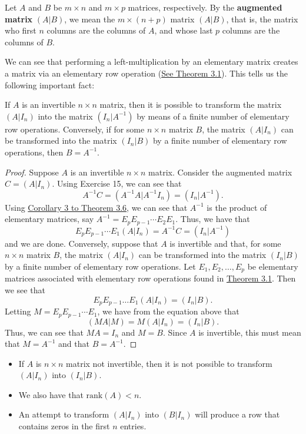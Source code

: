 \begin{definition}
   Let \( A  \) and \( B  \) be \( m \times n  \) and \( m \times p  \) matrices, respectively. By the \textbf{augmented matrix} \( (A|B)  \), we mean the \( m \times (n + p)  \) matrix \( (A|B)  \), that is, the matrix who first \( n  \) columns are the columns of \( A  \), and whose last \( p  \) columns are the columns of \( B  \).
\end{definition}
We can see that performing a left-multiplication by an elementary matrix creates a matrix via an elementary row operation ({\hyperref[Theorem 3.1]{See Theorem 3.1}}). This tells us the following important fact:
\begin{prop}
    If \( A  \) is an invertible \( n \times n  \) matrix, then it is possible to transform the matrix \( (A| {I}_{n})  \) into the matrix \( ({I}_{n} | A^{-1}) \) by means of a finite number of elementary row operations. Conversely, if for some \( n \times n  \) matrix \( B  \), the matrix \( (A | {I}_{n}) \) can be transformed into the matrix \( ({I}_{n} | B ) \) by a finite number of elementary row operations, then \( B = A^{-1} \).
\end{prop}
\begin{proof}
Suppose \( A  \) is an invertible \( n \times n  \) matrix. Consider the augmented matrix \( C = (A | {I}_{n}) \). Using Exercise 15, we can see that
\[  A^{-1} C = (A^{-1} A | A^{-1} {I}_{n}) = ({I}_{n} | A^{-1}). \]
Using {\hyperref[Corollary 3 to Theorem 3.6]{Corollary 3 to Theorem 3.6}}, we can see that \( A^{-1} \) is the product of elementary matrices, say \( A^{-1} = {E}_{p} {E}_{p-1} \cdots {E}_{2} {E}_{1}  \). Thus, we have that
\[  {E}_{p} {E}_{p-1} \cdots {E}_{1} (A| {I}_{n}) = A^{-1} C = ({I}_{n} | A^{-1}) \]
and we are done.
Conversely, suppose that \( A  \) is invertible and that, for some \(  n \times n  \) matrix \( B  \), the matrix \( (A | {I}_{n}) \) can be transformed into the matrix \( ({I}_{n} | B ) \) by a finite number of elementary row operations. Let \( {E}_{1}, {E}_{2}, \dots, {E}_{p} \) be elementary matrices associated with elementary row operations found in {\hyperref[Theorem 3.1]{Theorem 3.1}}. Then we see that
\[ {E}_{p } {E}_{p-1} \dots {E}_{1} (A | {I}_{n}) = ({I}_{n} | B).  \]
Letting \( M = {E}_{p} {E}_{p-1} \cdots {E}_{1} \), we have from the equation above that
\[  (MA | M) = M(A | {I}_{n}) = ({I}_{n} | B). \]
Thus, we can see that \( MA = {I}_{n} \) and \( M = B  \). Since \( A  \) is invertible, this must mean that \( M = A^{-1} \) and that \( B = A^{-1} \). 
\end{proof}

\begin{itemize}
    \item If \( A  \) is \( n \times n \) matrix not invertible, then it is not possible to transform \( (A|{I}_{n}) \) into \( ({I}_{n} | B ) \). 
    \item We also have that \( \text{rank}(A) < n \).
    \item An attempt to transform \( (A | {I}_{n})  \) into \( (B | {I}_{n}) \) will produce a row that contains zeros in the first \( n  \) entries.
\end{itemize}

